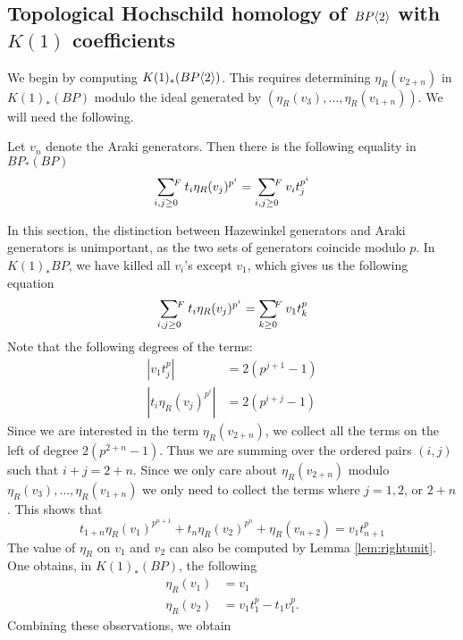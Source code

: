 \subsection{Topological Hochschild homology of $BP\langle 2 \rangle$ with $K(1)$ coefficients}

We begin by computing $K(1)_*(BP\langle 2 \rangle)$. This requires determining $\eta_R(v_{2+n})$ in $K(1)_*(BP)$ modulo the ideal generated by $(\eta_R(v_3), \ldots, \eta_R(v_{1+n}))$. We will need the following. 

\begin{lem}\label{lem:rightunit}{\cite[Lemma A.2.2.5]{greenbook}} Let $v_n$ denote the Araki generators. Then there is the following equality in $BP_*(BP)$
\[
\sum_{i,j\geq 0}\hspace{-5pt}\mbox{}^F\: t_i\eta_R(v_j)^{p^i}=\sum_{i,j\geq 0}\hspace{-5pt}\mbox{}^F\:v_it_j^{p^i}
\]
\end{lem}

In this section, the distinction between Hazewinkel generators and Araki generators is unimportant, as the two sets of generators coincide modulo $p$. In $K(1)_*BP$, we have killed all $v_i$'s except $v_1$, which gives us the following equation
\[
\sum_{i,j\geq 0}\hspace{-5pt}\mbox{}^F\: t_i\eta_R(v_j)^{p^i}=\sum_{k\geq 0}\hspace{-4pt}\mbox{}^F\:v_1t_k^{p}
\]
Note that the following degrees of the terms:
\begin{align*}
	|v_1t_j^p|&= 2(p^{j+1}-1)\\
	|t_i\eta_R(v_j)^{p^i}|&= 2(p^{i+j}-1)
\end{align*}
Since we are interested in the term $\eta_R(v_{2+n})$, we collect all the terms on the left of degree $2(p^{2+n}-1)$. Thus we are summing over the ordered pairs $(i,j)$ such that $i+j=2+n$. Since we only care about $\eta_R(v_{2+n})$ modulo $\eta_R(v_3), \ldots, \eta_R(v_{1+n})$ we only need to collect the terms where $j=1, 2$, or $2+n$. This shows that 
\[
t_{1+n}\eta_R(v_1)^{p^{n+1}}+t_n\eta_R(v_2)^{p^n}+\eta_R(v_{n+2})=v_1t_{n+1}^p
\]
The value of $\eta_R$ on $v_1$ and $v_2$ can also be computed by Lemma \ref{lem:rightunit}. One obtains, in $K(1)_*(BP)$, the following
\begin{align*}
\eta_R(v_1)&=v_1\\
\eta_R(v_2)&=v_1t_1^p-t_1v_1^p.
\end{align*}
Combining these observations, we obtain

